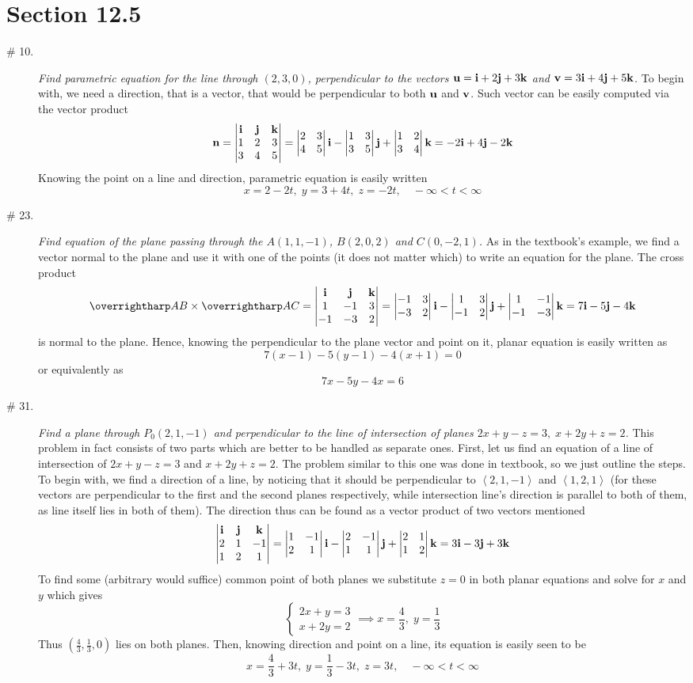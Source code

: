 \documentclass[8pt]{article} %
\begin{document}
\section{Section 12.5}
\begin{description}
	\item[\# 10.]{{\it Find parametric equation for the line through $(2,3,0)$, perpendicular to the vectors $\mathbf{u}=\mathbf{i}+
		2\mathbf{j}+3\mathbf{k}$ and $\mathbf{v}=3\mathbf{i}+4\mathbf{j}+5\mathbf{k}$.
		}
		To begin with, we need a direction, that is a vector, that would be perpendicular to both $\mathbf{u}$ and $\mathbf{v}$. Such vector
		can be easily computed via the vector product
		\[\mathbf{n}=\begin{vmatrix}\mathbf{i}&\mathbf{j}&\mathbf{k}\\1&2&3\\3&4&5\end{vmatrix}= \begin{vmatrix}2&3\\4&5\end{vmatrix}\mathbf{i} -\begin{vmatrix}1&3\\3&5\end{vmatrix}\mathbf{j} +\begin{vmatrix}1&2\\3&4\end{vmatrix}\mathbf{k}=-2\mathbf{i}+4\mathbf{j}-2\mathbf{k}\]
		Knowing the point on a line and direction, parametric equation is easily written
		\[x=2-2t,\;y=3+4t,\;z=-2t,\quad-\infty<t<\infty\]
		}
	\item[\# 23.]{{\it Find equation of the plane passing through the $A(1,1,-1)$, $B(2,0,2)$ and $C(0,-2,1)$.
		}
		As in the textbook's example, we find a vector normal to the plane and use it with one of the points (it does
		not matter which) to write an equation for the plane.
		The cross product
		\[\myvec{AB}\times\myvec{AC}=\myvecprodexpanded{1}{-1}{3}{-1}{-3}{2}=7\i-5\j-4\k\]
		is normal to the plane. Hence, knowing the perpendicular to the plane vector and point on it, planar equation is easily written as
		\[7(x-1)-5(y-1)-4(x+1)=0\]or equivalently as\[7x-5y-4x=6\]
		}
	\item[\# 31.]{{\it Find a plane through $P_0(2,1,-1)$ and perpendicular to the line of intersection of planes $2x+y-z=3,\;
		x+2y+z=2$.
		}
		This problem in fact consists of two parts which are better to be handled as separate ones. First, let us find an equation of a line
		of intersection of $2x+y-z=3$ and $x+2y+z=2$. The problem similar to this one was done in textbook, so we just outline the steps.
		To begin with, we find a direction of a line, by noticing that it should be perpendicular to $\left<2,1,-1\right>$ and
		$\left<1,2,1\right>$ (for these vectors are perpendicular to the first and the second planes
		respectively, while intersection line's direction is parallel to both of them, as line itself lies in both of them). The
		direction thus can be found as a vector product of two vectors mentioned
		\[\begin{vmatrix}\mathbf{i}&\mathbf{j}&\mathbf{k}\\2&1&-1\\1&2&1\end{vmatrix}= \begin{vmatrix}1&-1\\2&1\end{vmatrix}\mathbf{i} -\begin{vmatrix}2&-1\\1&1\end{vmatrix}\mathbf{j} +\begin{vmatrix}2&1\\1&2\end{vmatrix}\mathbf{k}=3\mathbf{i}-3\mathbf{j}+3\mathbf{k}\]
		To find some (arbitrary would suffice) common point of both planes we substitute $z=0$ in both planar equations and solve for $x$
		and $y$ which gives
		\[\begin{cases}2x+y=3\\x+2y=2\end{cases}\implies x=\frac{4}{3},\;y=\frac{1}{3}\]
		Thus $\left(\frac{4}{3},\frac{1}{3},0\right)$ lies on both planes. Then, knowing direction and point on a line, its equation is
		easily seen to be
		\[x=\frac{4}{3}+3t,\;y=\frac{1}{3}-3t,\;z=3t,\quad -\infty<t<\infty\]

}
\end{description}
\end{document}
